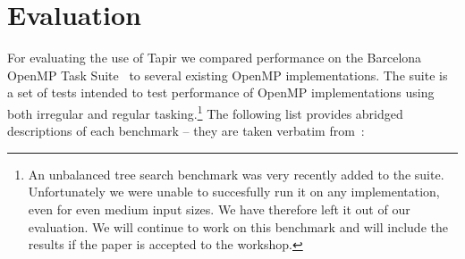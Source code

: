 \documentclass[sigconf]{acmart}
\begin{document}
\section{Evaluation} \label{Sec:Evaluation}

For evaluating the use of Tapir we compared performance on the Barcelona OpenMP Task 
Suite~\cite{barcelona} to several existing OpenMP implementations. The suite is a set 
of tests intended to test performance of OpenMP implementations
using both irregular and regular tasking.\footnote{An unbalanced tree search benchmark was
very recently added to the suite. Unfortunately we were unable to succesfully run 
it on any implementation, even for even medium input sizes. We have therefore left 
it out of our evaluation.  We will continue to work on this benchmark and will 
include the results if the paper is accepted to the workshop.} The following list provides abridged descriptions of 
each benchmark -- they are taken verbatim from~\cite{barcelona}:
\end{document}
